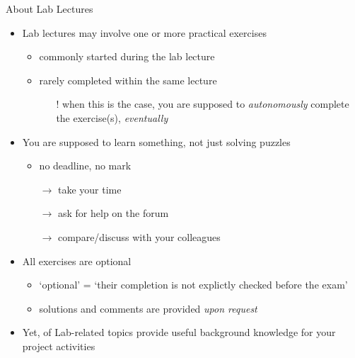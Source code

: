 \documentclass[presentation]{beamer}\mode<presentation>{\usetheme{AMSBolognaFC}}
\begin{document}
\begin{frame}[c,allowframebreaks]{About Lab Lectures}

    \begin{itemize}

        \item Lab lectures may involve one or more practical exercises
        \begin{itemize}
            \item commonly started during the lab lecture
            \item rarely completed within the same lecture
			\begin{itemize}
				\item[!] when this is the case, you are supposed to \emph{autonomously} complete the exercise(s), \emph{eventually}
			\end{itemize}
        \end{itemize}

        \bigskip

        \item You are supposed to learn something, not just solving puzzles
        \begin{itemize}
            \item no deadline, no mark
            \item[$\rightarrow$] take your time
            \item[$\rightarrow$] ask for help on the forum
            \item[$\rightarrow$] compare/discuss with your colleagues
        \end{itemize}

        \bigskip

        \item \alert{All} exercises are \alert{optional}
        \begin{itemize}
			\item `optional' = `their completion is not explictly checked before the exam'
            \item solutions and comments are provided \emph{upon request}
        \end{itemize}

        \framebreak

        \item Yet, of Lab-related topics provide useful background knowledge for your project activities

        \bigskip


\end{itemize}
\end{frame}
\end{document}

